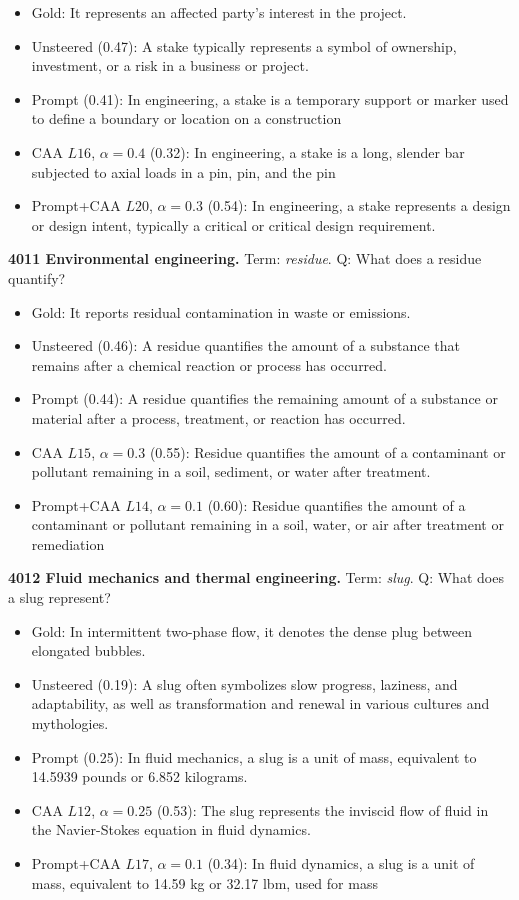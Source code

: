 \begin{itemize}\setlength{\itemsep}{0.15em}\setlength{\parsep}{0pt}\setlength{\topsep}{0.2em}
\item Gold: It represents an affected party's interest in the project.
\item Unsteered (0.47): A stake typically represents a symbol of ownership, investment, or a risk in a business or project.
\item Prompt (0.41): In engineering, a stake is a temporary support or marker used to define a boundary or location on a construction
\item CAA $L16$, $\alpha=0.4$ (0.32): In engineering, a stake is a long, slender bar subjected to axial loads in a pin, pin, and the pin
\item Prompt+CAA $L20$, $\alpha=0.3$ (0.54): In engineering, a stake represents a design or design intent, typically a critical or critical design requirement.
\end{itemize}
\medskip\noindent\textbf{4011 Environmental engineering.} Term: \emph{residue}.
Q: What does a residue quantify?
\begin{itemize}\setlength{\itemsep}{0.15em}\setlength{\parsep}{0pt}\setlength{\topsep}{0.2em}
\item Gold: It reports residual contamination in waste or emissions.
\item Unsteered (0.46): A residue quantifies the amount of a substance that remains after a chemical reaction or process has occurred.
\item Prompt (0.44): A residue quantifies the remaining amount of a substance or material after a process, treatment, or reaction has occurred.
\item CAA $L15$, $\alpha=0.3$ (0.55): Residue quantifies the amount of a contaminant or pollutant remaining in a soil, sediment, or water after treatment.
\item Prompt+CAA $L14$, $\alpha=0.1$ (0.60): Residue quantifies the amount of a contaminant or pollutant remaining in a soil, water, or air after treatment or remediation
\end{itemize}
\medskip\noindent\textbf{4012 Fluid mechanics and thermal engineering.} Term: \emph{slug}.
Q: What does a slug represent?
\begin{itemize}\setlength{\itemsep}{0.15em}\setlength{\parsep}{0pt}\setlength{\topsep}{0.2em}
\item Gold: In intermittent two-phase flow, it denotes the dense plug between elongated bubbles.
\item Unsteered (0.19): A slug often symbolizes slow progress, laziness, and adaptability, as well as transformation and renewal in various cultures and mythologies.
\item Prompt (0.25): In fluid mechanics, a slug is a unit of mass, equivalent to 14.5939 pounds or 6.852 kilograms.
\item CAA $L12$, $\alpha=0.25$ (0.53): The slug represents the inviscid flow of fluid in the Navier-Stokes equation in fluid dynamics.
\item Prompt+CAA $L17$, $\alpha=0.1$ (0.34): In fluid dynamics, a slug is a unit of mass, equivalent to 14.59 kg or 32.17 lbm, used for mass
\end{itemize}
